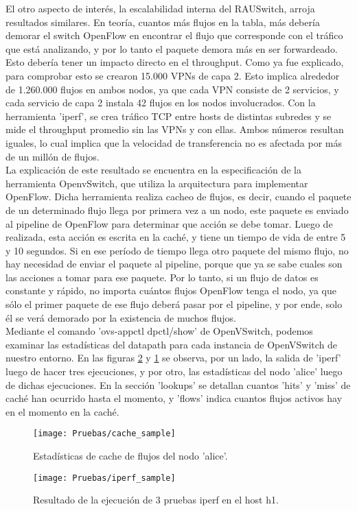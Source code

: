 El otro aspecto de interés, la escalabilidad interna del RAUSwitch, arroja resultados similares. En teoría, cuantos más flujos en la tabla, más debería demorar el switch OpenFlow en encontrar el flujo que corresponde con el tráfico que está analizando, y por lo tanto el paquete demora más en ser forwardeado. Esto debería tener un impacto directo en el throughput. Como ya fue explicado, para comprobar esto se crearon 15.000 VPNs de capa 2. Esto implica alrededor de 1.260.000 flujos en ambos nodos, ya que cada VPN consiste de 2 servicios, y cada servicio de capa 2 instala 42 flujos en los nodos involucrados. Con la herramienta 'iperf', se crea tráfico TCP entre hosts de distintas subredes y se mide el throughput promedio sin las VPNs y con ellas. Ambos números resultan iguales, lo cual implica que la velocidad de transferencia no es afectada por más de un millón de flujos.\\
La explicación de este resultado se encuentra en la especificación de la herramienta OpenvSwitch, que utiliza la arquitectura para implementar OpenFlow. Dicha herramienta realiza cacheo de flujos, es decir, cuando el paquete de un determinado flujo llega por primera vez a un nodo, este paquete es enviado al pipeline de OpenFlow para determinar que acción se debe tomar. Luego de realizada, esta acción es escrita en la caché, y tiene un tiempo de vida de entre 5 y 10 segundos. Si en ese período de tiempo llega otro paquete del mismo flujo, no hay necesidad de enviar el paquete al pipeline, porque que ya se sabe cuales son las acciones a tomar para ese paquete. Por lo tanto, si un flujo de datos es constante y rápido, no importa cuántos flujos OpenFlow tenga el nodo, ya que sólo el primer paquete de ese flujo deberá pasar por el pipeline, y por ende, solo él se verá demorado por la existencia de muchos flujos.
\\

Mediante el comando 'ovs-appctl dpctl/show' de OpenVSwitch, podemos examinar las estadísticas del datapath para cada instancia de OpenVSwitch de nuestro entorno. En las figuras \ref{fig:iperf_sample} y \ref{fig:cache_sample} se observa, por un lado, la salida de 'iperf' luego de hacer tres ejecuciones, y por otro, las estadísticas del nodo 'alice' luego de dichas ejecuciones. En la sección 'lookups' se detallan cuantos 'hits' y 'miss' de caché han ocurrido hasta el momento, y 'flows' indica cuantos flujos activos hay en el momento en la caché.
\begin{figure}[t]
	\caption{Estadísticas de cache de flujos del nodo 'alice'.}
	\texttt{[image: Pruebas/cache\_sample]}
	\centering
	\label{fig:cache_sample}
\end{figure}

\begin{figure}[t]
	\caption{Resultado de la ejecución de 3 pruebas iperf en el host h1.}
	\texttt{[image: Pruebas/iperf\_sample]}
	\centering
	\label{fig:iperf_sample}
\end{figure}